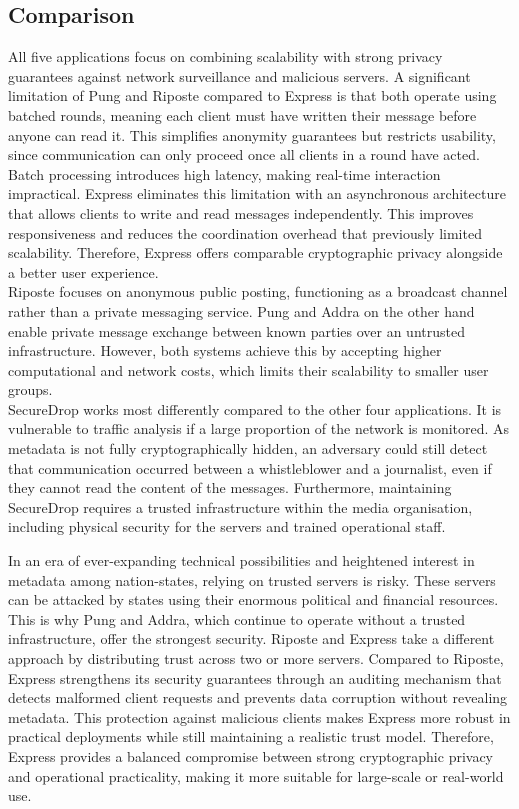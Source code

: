 \documentclass[a4paper]{article}
\begin{document}
\subsection{Comparison}
All five applications focus on combining scalability with strong privacy guarantees against network surveillance and malicious servers. A significant limitation of Pung and Riposte compared to Express is that both operate using batched rounds, meaning each client must have written their message before anyone can read it. This simplifies anonymity guarantees but restricts usability, since communication can only proceed once all clients in a round have acted. Batch processing introduces high latency, making real-time interaction impractical. Express eliminates this limitation with an asynchronous architecture that allows clients to write and read messages independently. This improves responsiveness and reduces the coordination overhead that previously limited scalability. Therefore, Express offers comparable cryptographic privacy alongside a better user experience. \\
Riposte focuses on anonymous public posting, functioning as a broadcast channel rather than a private messaging service. Pung and Addra on the other hand enable private message exchange between known parties over an untrusted infrastructure. However, both systems achieve this by accepting higher computational and network costs, which limits their scalability to smaller user groups. \\
SecureDrop works most differently compared to the other four applications. It is vulnerable to traffic analysis if a large proportion of the network is monitored. As metadata is not fully  cryptographically hidden, an adversary could still detect that communication occurred between a whistleblower and a journalist, even if they cannot read the content of the messages. Furthermore, maintaining SecureDrop requires a trusted infrastructure within the media organisation, including physical security for the servers and trained operational staff.

In an era of ever-expanding technical possibilities and heightened interest in metadata among nation-states, relying on trusted servers is risky. These servers can be attacked by states using their enormous political and financial resources. This is why Pung and Addra, which continue to operate without a trusted infrastructure, offer the strongest security. Riposte and Express take a different approach by distributing trust across two or more servers. Compared to Riposte, Express strengthens its security guarantees through an auditing mechanism that detects malformed client requests and prevents data corruption without revealing metadata.
This protection against malicious clients makes Express more robust in practical deployments while still maintaining a realistic trust model. Therefore, Express provides a balanced compromise between strong cryptographic privacy and operational practicality, making it more suitable for large-scale or real-world use.
\end{document}
